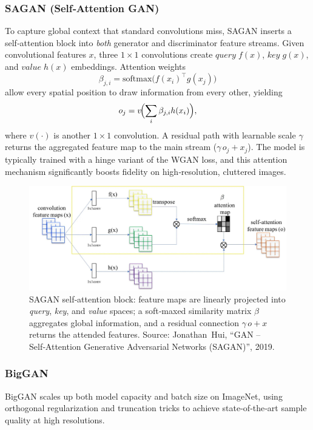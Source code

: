 \documentclass{article}
\begin{document}
\subsubsection{SAGAN (Self‑Attention GAN)}
To capture global context that standard convolutions miss, SAGAN inserts a self‑attention block into \emph{both} generator and discriminator feature streams.  
Given convolutional features \(x\), three \(1{\times}1\) convolutions create
\(\textit{query}\;f(x)\), \(\textit{key}\;g(x)\), and \(\textit{value}\;h(x)\) embeddings.  
Attention weights
\[
  \beta_{j,i}= \mathrm{softmax}\bigl(f(x_i)^{\!\top}g(x_j)\bigr)
\]
allow every spatial position to draw information from every other, yielding
\[
  o_j = v\!\Bigl(\sum_i \beta_{j,i} h(x_i)\Bigr),
\]
where \(v(\cdot)\) is another \(1{\times}1\) convolution.  
A residual path with learnable scale \(\gamma\) returns the aggregated feature map to the main stream (\(\gamma\,o_j + x_j\)).  
The model is typically trained with a hinge variant of the WGAN loss, and this attention mechanism significantly boosts fidelity on high‑resolution, cluttered images.

\begin{figure}[ht]
    \centering
    \includegraphics[width=0.8\linewidth]{graphics/S9GAN/sagan.jpg}
    \caption{SAGAN self‑attention block: feature maps are linearly projected into \textit{query}, \textit{key}, and \textit{value} spaces; a soft‑maxed similarity matrix \(\beta\) aggregates global information, and a residual connection \(\gamma\,o+x\) returns the attended features.  
    Source: Jonathan Hui, “GAN – Self‑Attention Generative Adversarial Networks (SAGAN)”, 2019.}
    \label{fig:sagan_attention}
\end{figure}

\subsubsection{BigGAN}
BigGAN scales up both model capacity and batch size on ImageNet, using orthogonal regularization and truncation tricks to achieve state‑of‑the‑art sample quality at high resolutions.
\end{document}
